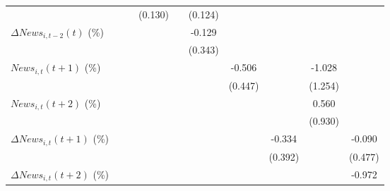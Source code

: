 {\begin{tabular}{l*{9}{c}}
                    &                     &                     &     (0.130)         &                     &     (0.124)         &                     &                     &                     &                     \\
\addlinespace
$ \Delta News_{i,t-2}(t)$ (\%)&                     &                     &                     &                     &      -0.129         &                     &                     &                     &                     \\
                    &                     &                     &                     &                     &     (0.343)         &                     &                     &                     &                     \\
\addlinespace
$ News_{i,t}(t+1)$ (\%)&                     &                     &                     &                     &                     &      -0.506         &                     &      -1.028         &                     \\
                    &                     &                     &                     &                     &                     &     (0.447)         &                     &     (1.254)         &                     \\
\addlinespace
$ News_{i,t}(t+2)$ (\%)&                     &                     &                     &                     &                     &                     &                     &       0.560         &                     \\
                    &                     &                     &                     &                     &                     &                     &                     &     (0.930)         &                     \\
\addlinespace
$ \Delta News_{i,t}(t+1)$ (\%)&                     &                     &                     &                     &                     &                     &      -0.334         &                     &      -0.090         \\
                    &                     &                     &                     &                     &                     &                     &     (0.392)         &                     &     (0.477)         \\
\addlinespace
$ \Delta News_{i,t}(t+2)$ (\%)&                     &                     &                     &                     &                     &                     &                     &                     &      -0.972         \\

\end{tabular}}
